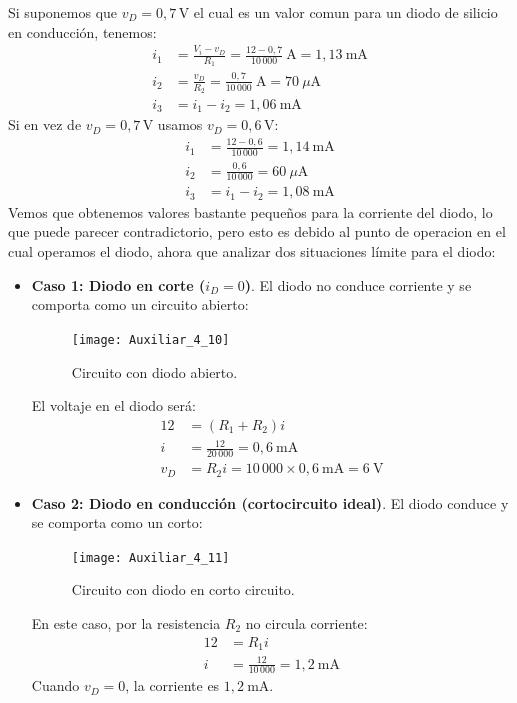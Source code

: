 \documentclass[
  11pt,
  letterpaper,
   addpoints,
   answers
  ]{exam}
\begin{document}
\begin{questions}
\begin{solution}
 Si suponemos que $v_D = 0{,}7\,\mathrm{V}$ el cual es un valor comun para un diodo de silicio en conducción, tenemos:
    \begin{align*}
        i_1 &= \frac{V_i - v_D}{R_1} = \frac{12 - 0{,}7}{10\,000}\ \mathrm{A} = 1{,}13\ \mathrm{mA} \\
        i_2 &= \frac{v_D}{R_2} = \frac{0{,}7}{10\,000}\ \mathrm{A} = 70\ \mu\mathrm{A} \\
        i_3 &= i_1 - i_2 = 1{,}06\ \mathrm{mA}
    \end{align*}
    Si en vez de $v_D = 0{,}7\,\mathrm{V}$ usamos $v_D = 0{,}6\,\mathrm{V}$:
    \begin{align*}
        i_1 &= \frac{12 - 0{,}6}{10\,000} = 1{,}14\ \mathrm{mA} \\
        i_2 &= \frac{0{,}6}{10\,000} = 60\ \mu\mathrm{A} \\
        i_3 &= i_1 - i_2 = 1{,}08\ \mathrm{mA}
    \end{align*}
Vemos que obtenemos valores bastante pequeños para la corriente del diodo, lo que puede parecer contradictorio, pero esto es debido al punto de operacion en el cual operamos el diodo, ahora que analizar dos situaciones límite para el diodo:
\begin{itemize}
    \item \textbf{Caso 1: Diodo en corte ($i_D = 0$)}. El diodo no conduce corriente y se comporta como un circuito abierto:
    \begin{figure}[H]
      \centering
      \texttt{[image: Auxiliar\_4\_10]}
      \caption{Circuito con diodo abierto.}
      \label{fig:th_norton_2}
    \end{figure}
    El voltaje en el diodo será:
    \begin{align*}
        12 &= (R_1 + R_2)i \\
        i &= \frac{12}{20\,000} = 0{,}6\ \mathrm{mA} \\
        v_D &= R_2 i = 10\,000 \times 0{,}6\ \mathrm{mA} = 6\ \mathrm{V}
    \end{align*}
    \item \textbf{Caso 2: Diodo en conducción (cortocircuito ideal)}. El diodo conduce y se comporta como un corto:
    \begin{figure}[H]
      \centering
      \texttt{[image: Auxiliar\_4\_11]}
      \caption{Circuito con diodo en corto circuito.}
      \label{fig:th_norton_3}
    \end{figure}
    En este caso, por la resistencia $R_2$ no circula corriente:
    \begin{align*}
        12 &= R_1 i \\
        i &= \frac{12}{10\,000} = 1{,}2\ \mathrm{mA}
    \end{align*}
    Cuando $v_D = 0$, la corriente es $1{,}2\ \mathrm{mA}$.
\end{itemize}


\end{solution}
\end{questions}
\end{document}
